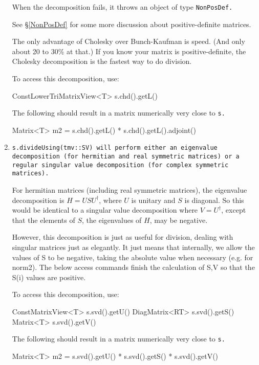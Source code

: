 \begin{enumerate}
When the decomposition fails, it throws an object of type
\tt{NonPosDef}.

See \S\ref{NonPosDef} for some more discussion about positive-definite
matrices.

The only advantage of Cholesky over Bunch-Kaufman is speed.  (And only about
20 to 30\% at that.)  If you know your 
matrix is positive-definite, the Cholesky decomposition is the fastest way to 
do division.

To access this decomposition, use:
\begin{tmvcode}
ConstLowerTriMatrixView<T> s.chd().getL()
\end{tmvcode}
The following should result in a matrix numerically very close to \tt{s}.
\begin{tmvcode}
Matrix<T> m2 = s.chd().getL() * s.chd().getL().adjoint()
\end{tmvcode}

\item
\tt{s.divideUsing(tmv::SV)} will perform either an eigenvalue decomposition
(for hermitian and real symmetric matrices) or a regular singular value
decomposition (for complex symmetric matrices).

For hermitian matrices (including real symmetric matrices), 
the eigenvalue decomposition is $H = U S U^\dagger$, where $U$ is
unitary and $S$ is diagonal.  So this would be identical to a singular
value decomposition where $V = U^\dagger$, 
except that the elements of $S$, the eigenvalues of $H$, may be negative.

However, this decomposition is just as useful for division, dealing with singular
matrices just as elegantly.  It just means that internally, we allow the values
of S to be negative, taking the absolute value when necessary (e.g. for norm2).
The below access commands finish the calculation of S,V so that the S(i)
values are positive. 

To access this decomposition, use:
\begin{tmvcode}
ConstMatrixView<T> s.svd().getU()
DiagMatrix<RT> s.svd().getS()
Matrix<T> s.svd().getV()
\end{tmvcode}
The following should result in a matrix numerically very close to \tt{s}.
\begin{tmvcode}
Matrix<T> m2 = s.svd().getU() * s.svd().getS() * s.svd().getV()
\end{tmvcode}


\end{enumerate}
